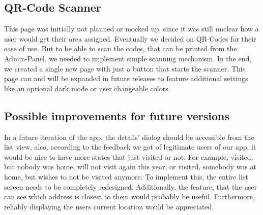 \subsection{QR-Code Scanner}
This page was initially not planned or mocked up, since it was still unclear how a user would get their area assigned. Eventually we decided on QR-Codes for their ease of use. But to be able to scan the codes, that can be printed from the Admin-Panel, we needed to implement simple scanning mechanism. In the end, we created a single new page with just a button that starts the scanner. This page can and will be expanded in future releases to feature additional settings like an optional dark mode or user changeable colors. 

\subsection{Possible improvements for future versions}

In a future iteration of the app, the details' dialog should be accessible from the list view, also, according to the feedback we got of legitimate users of our app, it would be nice to have more states that just visited or not. For example, visited, but nobody was home, will not visit again this year, or visited, somebody was at home, but wishes to not be visited anymore. To implement this, the entire list screen needs to be completely redesigned. Additionally, the feature, that the user can see which address is closest to them would probably be useful. Furthermore, reliably displaying the users current location would be appreciated.